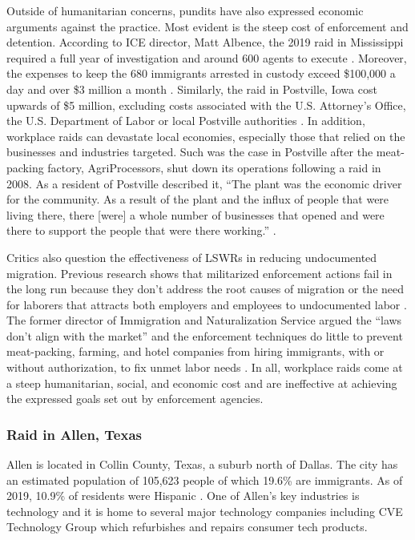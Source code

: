\documentclass[hidelinks,twoside]{article}
\begin{document}
Outside of humanitarian concerns, pundits have also expressed economic arguments against the practice. Most evident is the steep cost of enforcement and detention. According to ICE director, Matt Albence, the 2019 raid in Mississippi required a full year of investigation and around 600 agents to execute \citep{bernal_2019_ice}. Moreover, the expenses to keep the 680 immigrants arrested in custody exceed \$100,000 a day and over \$3 million a month \citep{departmentofhomelandsecurity_2018_budgetinbrief}. Similarly, the raid in Postville, Iowa cost upwards of \$5 million, excluding costs associated with the U.S. Attorney's Office, the U.S. Department of Labor or local Postville authorities \citep{crowder_2018_postville}. In addition, workplace raids can devastate local economies, especially those that relied on the businesses and industries targeted. Such was the case in Postville after the meat-packing factory, AgriProcessors, shut down its operations following a raid in 2008. As a resident of Postville described it, “The plant was the economic driver for the community. As a result of the plant and the influx of people that were living there, there [were] a whole number of businesses that opened and were there to support the people that were there working.” \citep{juby_2011_postville}.

Critics also question the effectiveness of LSWRs in reducing undocumented migration. Previous research shows that militarized enforcement actions fail in the long run because they don’t address the root causes of migration or the need for laborers that attracts both employers and employees to undocumented labor \citep{massey_2016_why}. The former director of Immigration and Naturalization Service argued the ``laws don’t align with the market” and the enforcement techniques do little to prevent meat-packing, farming, and hotel companies from hiring immigrants, with or without authorization, to fix unmet labor needs \citep{kitroeff_2018_workplace}. In all, workplace raids come at a steep humanitarian, social, and economic cost and are ineffective at achieving the expressed goals set out by enforcement agencies. 

\vspace{-0.5em}
\subsubsection*{Raid in Allen, Texas}

Allen is located in Collin County, Texas, a suburb north of Dallas. The city has an estimated population of 105,623 people of which 19.6\% are immigrants. As of 2019, 10.9\% of residents were Hispanic \citep{uscensusbureau_2019_2019}. One of Allen’s key industries is technology and it is home to several major technology companies including CVE Technology Group which refurbishes and repairs consumer tech products. 
\end{document}

